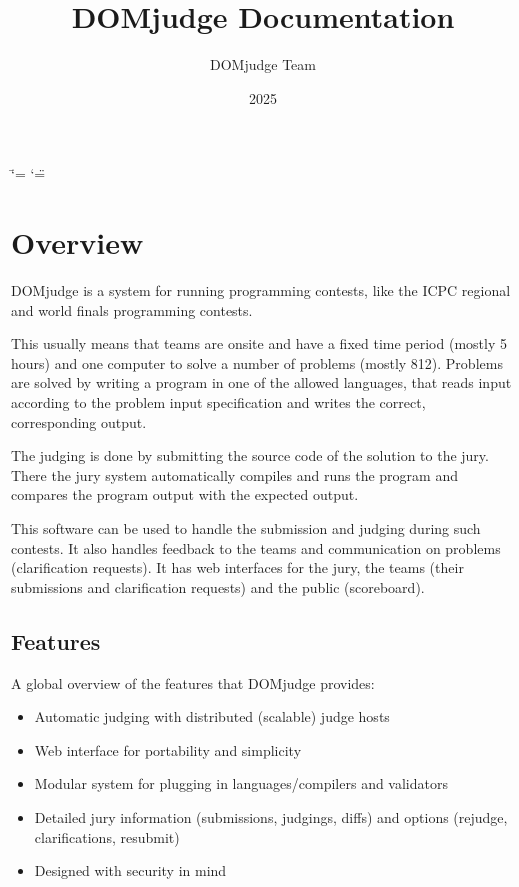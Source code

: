 \documentclass[a4paper,10pt,english,openany]{sphinxmanual}
\title{DOMjudge Documentation}
\date{2025}
\author{DOMjudge Team}
\begin{document}
\ifdefined\shorthandoff
  \ifnum\catcode`\=\string=\active\shorthandoff{=}\fi
  \ifnum\catcode`\"=\active{}\fi
\fi

\pagestyle{empty}

\pagestyle{plain}

\pagestyle{normal}
\label{\detokenize{index::doc}}


\sphinxstepscope


\section{Overview}
\label{\detokenize{overview:overview}}\label{\detokenize{overview::doc}}
\sphinxAtStartPar
DOMjudge is a system for running programming contests, like the ICPC
regional and world finals programming contests.

\sphinxAtStartPar
This usually means that teams are on\sphinxhyphen{}site and have a fixed time period (mostly
5 hours) and one computer to solve a number of problems (mostly 8\sphinxhyphen{}12). Problems
are solved by writing a program in one of the allowed languages, that reads
input according to the problem input specification and writes the correct,
corresponding output.

\sphinxAtStartPar
The judging is done by submitting the source code of the solution to the jury.
There the jury system automatically compiles and runs the program and compares
the program output with the expected output.

\sphinxAtStartPar
This software can be used to handle the submission and judging during such
contests. It also handles feedback to the teams and communication on problems
(clarification requests). It has web interfaces for the jury, the teams (their
submissions and clarification requests) and the public (scoreboard).


\subsection{Features}
\label{\detokenize{overview:features}}
\sphinxAtStartPar
A global overview of the features that DOMjudge provides:
\begin{itemize}
\item {} 
\sphinxAtStartPar
Automatic judging with distributed (scalable) judge hosts

\item {} 
\sphinxAtStartPar
Web interface for portability and simplicity

\item {} 
\sphinxAtStartPar
Modular system for plugging in languages/compilers and validators

\item {} 
\sphinxAtStartPar
Detailed jury information (submissions, judgings, diffs)
and options (rejudge, clarifications, resubmit)

\item {} 
\sphinxAtStartPar
Designed with security in mind

\end{itemize}
\end{document}
